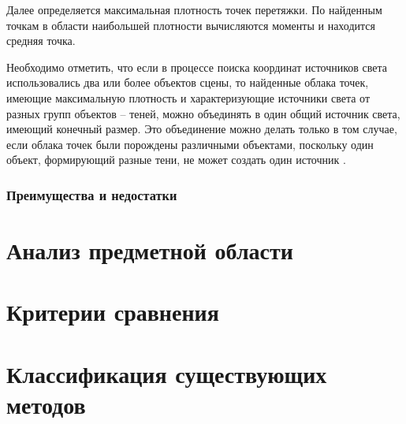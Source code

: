 Далее определяется максимальная плотность точек перетяжки. По найденным точкам в области наибольшей плотности вычисляются моменты и находится средняя точка.

Необходимо отметить, что если в процессе поиска координат источников света использовались два или более объектов сцены, то найденные облака точек, имеющие максимальную плотность и характеризующие источники света от разных групп объектов – теней, можно объединять в один общий источник света, имеющий конечный размер. Это объединение можно делать только в том случае, если облака точек были порождены различными объектами, поскольку один объект, формирующий разные тени, не может создать один источник \cite{sns_tras}.

\subsubsection*{Преимущества и недостатки}



\section{Анализ предметной области}



\section{Критерии сравнения}



\section{Классификация существующих методов}



